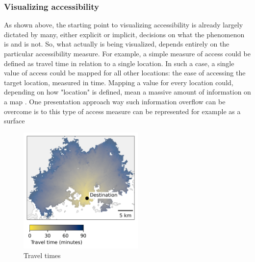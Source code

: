 \subsubsection{Visualizing accessibility}

As shown above,
the starting point to visualizing accessibility is already largely dictated by
many, either explicit or implicit, decisions on what the phenomenon is and is not.
So, what actually is being visualized, depends entirely on
the particular accessibility measure.
For example, a simple measure of access could be defined as
travel time in relation to a single location.
In such a case, a single value of access could be mapped
for all other locations:
the ease of accessing the target location, measured in time.
Mapping a value for every location could,
depending on how "location" is defined,
mean a massive amount of information on a map .
One presentation approach way such information overflow can be overcome is to 
this type of access measure can be represented for example
as a surface

\begin{figure}[H]
	\centering
	\includegraphics[width=0.55\textwidth]{visual/figures/ttm/tt_surface.png}
	\caption{
		Travel times
	}
	\label{fig:tt surface}
\end{figure}

